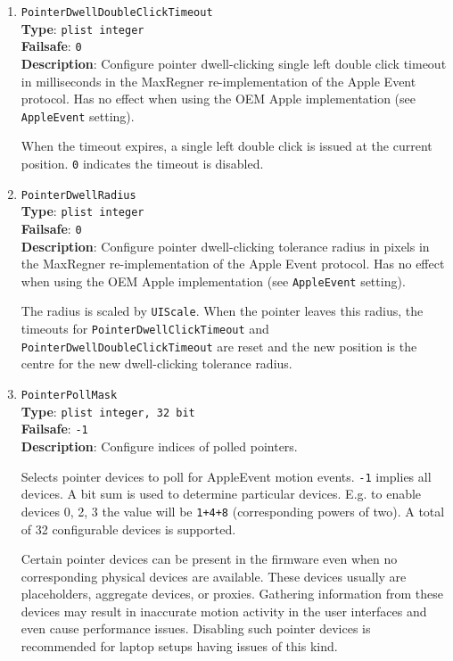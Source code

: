 \documentclass[]{article}
\begin{document}
\begin{enumerate}
  When the timeout expires, a single left click is issued at the current position.
  \texttt{0} indicates the timeout is disabled.

\item
  \texttt{PointerDwellDoubleClickTimeout}\\
  \textbf{Type}: \texttt{plist\ integer}\\
  \textbf{Failsafe}: \texttt{0}\\
  \textbf{Description}: Configure pointer dwell-clicking single left double click timeout in
  milliseconds in the MaxRegner re-implementation of the Apple Event protocol.
  Has no effect when using the OEM Apple implementation (see \texttt{AppleEvent} setting).

  When the timeout expires, a single left double click is issued at the current position.
  \texttt{0} indicates the timeout is disabled.

\item
  \texttt{PointerDwellRadius}\\
  \textbf{Type}: \texttt{plist\ integer}\\
  \textbf{Failsafe}: \texttt{0}\\
  \textbf{Description}: Configure pointer dwell-clicking tolerance radius in pixels in the
  MaxRegner re-implementation of the Apple Event protocol.
  Has no effect when using the OEM Apple implementation (see \texttt{AppleEvent} setting).

  The radius is scaled by \texttt{UIScale}. When the pointer leaves this radius, the timeouts for \texttt{PointerDwellClickTimeout}
  and \texttt{PointerDwellDoubleClickTimeout} are reset and the new position is the centre
  for the new dwell-clicking tolerance radius.

\item
  \texttt{PointerPollMask}\\
  \textbf{Type}: \texttt{plist\ integer, 32 bit}\\
  \textbf{Failsafe}: \texttt{-1}\\
  \textbf{Description}: Configure indices of polled pointers.

  Selects pointer devices to poll for AppleEvent motion events.
  \texttt{-1} implies all devices. A bit sum is used to determine
  particular devices. E.g. to enable devices 0, 2, 3 the value
  will be \texttt{1+4+8} (corresponding powers of two). A total
  of 32 configurable devices is supported.

  Certain pointer devices can be present in the firmware even when
  no corresponding physical devices are available. These devices
  usually are placeholders, aggregate devices, or proxies.
  Gathering information from these devices may result in inaccurate
  motion activity in the user interfaces and even cause performance
  issues. Disabling such pointer devices is recommended for laptop
  setups having issues of this kind.


\end{enumerate}
\end{document}
